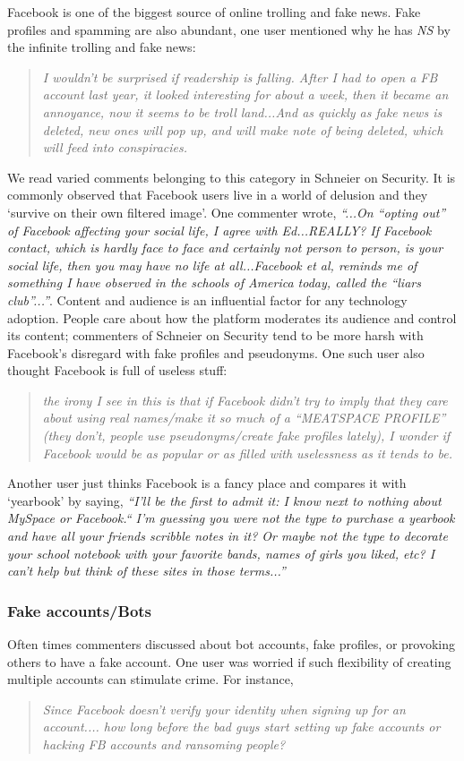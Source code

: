 Facebook is one of the biggest source of online trolling and fake news. Fake profiles and spamming are also abundant, one user mentioned why he has \emph{NS} by the infinite trolling and fake news:

\begin{quote}
         \textit{I wouldn't be surprised if readership is falling. After I had to open a FB account last year, it looked interesting for about a week, then it became an annoyance, now it seems to be troll land...And as quickly as fake news is deleted, new ones will pop up, and will make note of being deleted, which will feed into conspiracies.}
    \end{quote}

We read varied comments belonging to this category in Schneier on Security. It is commonly observed that Facebook users live in a world of delusion and they `survive on their own filtered image'. One commenter wrote, \textit{``...On ``opting out'' of Facebook affecting your social life, I agree with Ed...REALLY? If Facebook contact, which is hardly face to face and certainly not person to person, is your social life, then you may have no life at all...Facebook et al, reminds me of something I have observed in the schools of America today, called the ``liars club''...''}. Content and audience is an influential factor for any technology adoption. People care about how the platform moderates its audience and control its content; commenters of Schneier on Security tend to be more harsh with Facebook's disregard with fake profiles and pseudonyms. One such user also thought Facebook is full of useless stuff:
\begin{quote}
         \textit{the irony I see in this is that if Facebook didn't try to imply that they care about using real names/make it so much of a ``MEATSPACE PROFILE'' (they don't, people use pseudonyms/create fake profiles lately), I wonder if Facebook would be as popular or as filled with uselessness as it tends to be.}
    \end{quote}
Another user just thinks Facebook is a fancy place and compares it with `yearbook' by saying, \textit{``I'll be the first to admit it: I know next to nothing about MySpace or Facebook.`` I'm guessing you were not the type to purchase a yearbook and have all your friends scribble notes in it? Or maybe not the type to decorate your school notebook with your favorite bands, names of girls you liked, etc? I can't help but think of these sites in those terms...''}

 \subsubsection{Fake accounts/Bots}
 Often times commenters discussed about bot accounts, fake profiles, or provoking others to have a fake account. One user was worried if such flexibility of creating multiple accounts can stimulate crime. For instance,
     \begin{quote}
         \textit{Since Facebook doesn't verify your identity when signing up for an account.... how long before the bad guys start setting up fake accounts or hacking FB accounts and ransoming people? }
     \end{quote}
    
